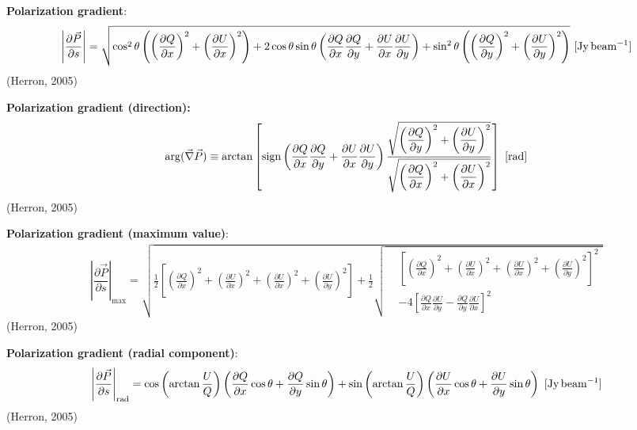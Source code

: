 \documentclass[a4paper,10pt]{article}
\begin{document}
{\noindent}\textbf{Polarization gradient}:
\begin{align*}
	\left\lvert\dfrac{\partial\vec{P}}{\partial s}\right\rvert = \sqrt{ \cos^2\theta\left(\left(\frac{\partial Q}{\partial x}\right)^2+\left(\frac{\partial U}{\partial x}\right)^2\right) + 2\cos\theta\sin\theta\left(\frac{\partial Q}{\partial x}\frac{\partial Q}{\partial y} + \frac{\partial U}{\partial x}\frac{\partial U}{\partial y}\right) + \sin^2\theta\left(\left(\frac{\partial Q}{\partial y}\right)^2 + \left(\frac{\partial U}{\partial y}\right)^2\right) } ~ [\rm Jy\,beam^{-1}]
\end{align*}
(Herron, 2005)

{\noindent}\textbf{Polarization gradient (direction):}
\begin{align*}
    \mathrm{arg}(\vec\nabla\vec{P}) \equiv \arctan \left[ \mathrm{sign} \left(\dfrac{\partial Q}{\partial x}\dfrac{\partial Q}{\partial y} + \dfrac{\partial U}{\partial x}\dfrac{\partial U}{\partial y}\right) \dfrac{\sqrt{\left(\dfrac{\partial Q}{\partial y}\right)^2 + \left(\dfrac{\partial U}{\partial y}\right)^2}}{\sqrt{\left(\dfrac{\partial Q}{\partial x}\right)^2 + \left(\dfrac{\partial U}{\partial x}\right)^2}} \right] ~ [\rm rad]
\end{align*}
(Herron, 2005)

{\noindent}\textbf{Polarization gradient (maximum value)}:
\begin{equation*}
\begin{split}
\left\lvert\dfrac{\partial\vec{P}}{\partial s}\right\rvert_\mathrm{max} = \sqrt{ \frac{1}{2}\left[ \left(\frac{\partial Q}{\partial x}\right)^2 + \left(\frac{\partial U}{\partial x}\right)^2 + \left(\frac{\partial U}{\partial x}\right)^2 + \left(\frac{\partial U}{\partial y}\right)^2 \right] + \frac{1}{2} 
  \sqrt{
    \begin{aligned}
    & \left[ \left(\frac{\partial Q}{\partial x}\right)^2 + \left(\frac{\partial U}{\partial x}\right)^2 + \left(\frac{\partial U}{\partial x}\right)^2 + \left(\frac{\partial U}{\partial y}\right)^2 \right]^2 \\
    &- 4\left[ \frac{\partial Q}{\partial x}\frac{\partial U}{\partial y} - \frac{\partial Q}{\partial y}\frac{\partial U}{\partial x}  \right]^2
    \end{aligned}
    }}
\end{split}
\end{equation*}
(Herron, 2005)

{\noindent}\textbf{Polarization gradient (radial component)}:
\begin{align*}
	\left\lvert\dfrac{\partial\vec{P}}{\partial s}\right\rvert_\mathrm{rad} = \cos\left(\arctan\frac{U}{Q}\right)\left(\frac{\partial Q}{\partial x}\cos\theta+\frac{\partial Q}{\partial y}\sin\theta\right) + \sin\left(\arctan\frac{U}{Q}\right)\left(\frac{\partial U}{\partial x}\cos\theta+\frac{\partial U}{\partial y}\sin\theta\right) ~ [\rm Jy\,beam^{-1}]
\end{align*}
(Herron, 2005)
\end{document}
